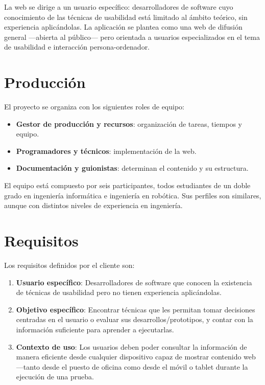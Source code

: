\documentclass[12pt, a4paper]{report}
\begin{document}
La web se dirige a un usuario específico: desarrolladores de software cuyo conocimiento de
las técnicas de usabilidad está limitado al ámbito teórico, sin experiencia aplicándolas. La
aplicación se plantea como una web de difusión general —abierta al público— pero
orientada a usuarios especializados en el tema de usabilidad e interacción persona-ordenador.

\section{Producción}

El proyecto se organiza con los siguientes roles de equipo:
\begin{itemize}
  \item \textbf{Gestor de producción y recursos}: organización de tareas, tiempos y equipo.
  \item \textbf{Programadores y técnicos}: implementación de la web.
  \item \textbf{Documentación y guionistas}: determinan el contenido y su estructura.
\end{itemize}

El equipo está compuesto por seis participantes, todos estudiantes de un doble grado en
ingeniería informática e ingeniería en robótica. Sus perfiles son similares, aunque con
distintos niveles de experiencia en ingeniería.

\section{Requisitos}

Los requisitos definidos por el cliente son:
\begin{enumerate}
  \item \textbf{Usuario específico}: Desarrolladores de software que conocen la existencia de
    técnicas de usabilidad pero no tienen experiencia aplicándolas.
  \item \textbf{Objetivo específico}: Encontrar técnicas que les permitan tomar decisiones
    centradas en el usuario o evaluar sus desarrollos/prototipos, y contar con la información
    suficiente para aprender a ejecutarlas.
  \item \textbf{Contexto de uso}: Los usuarios deben poder consultar la información de
    manera eficiente desde cualquier dispositivo capaz de mostrar contenido web —tanto desde
    el puesto de oficina como desde el móvil o tablet durante la ejecución de una prueba.
\end{enumerate}
\end{document}
